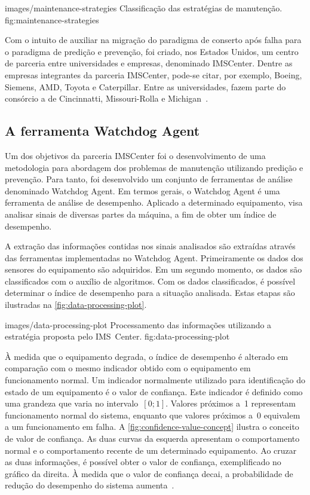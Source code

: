     {images/maintenance-strategies}
    {Classificação das estratégias de manutenção.}
    {fig:maintenance-strategies}

Com o intuito de auxiliar na migração do paradigma de conserto após falha para o paradigma de
predição e prevenção, foi criado, nos Estados Unidos, um centro de parceria entre universidades e
empresas, denominado \gls{IMSCenter}. Dentre as empresas integrantes da parceria \gls{IMSCenter},
pode-se citar, por exemplo, Boeing, Siemens, AMD, Toyota e Caterpillar. Entre as universidades,
fazem parte do consórcio a de Cincinnatti, Missouri-Rolla e Michigan~\cite{ims2014homepage}.


\subsection{A ferramenta Watchdog Agent}

Um dos objetivos da parceria \gls{IMSCenter} foi o desenvolvimento de uma metodologia para abordagem
dos problemas de manutenção utilizando predição e prevenção. Para tanto, foi desenvolvido um
conjunto de ferramentas de análise denominado Watchdog Agent. Em termos gerais, o Watchdog Agent é
uma ferramenta de análise de desempenho. Aplicado a determinado equipamento, visa analisar sinais de
diversas partes da máquina, a fim de obter um índice de desempenho.

A extração das informações contidas nos sinais analisados são extraídas através das ferramentas
implementadas no Watchdog Agent. Primeiramente os dados dos sensores do equipamento são adquiridos.
Em um segundo momento, os dados são classificados com o auxílio de algoritmos. Com os dados
classificados, é possível determinar o índice de desempenho para a situação analisada. Estas etapas
são ilustradas na \cref{fig:data-processing-plot}.

    {images/data-processing-plot}
    {Processamento das informações utilizando a estratégia proposta pelo IMS~Center.}
    {fig:data-processing-plot}

À medida que o equipamento degrada, o índice de desempenho é alterado em comparação com o mesmo
indicador obtido com o equipamento em funcionamento normal. Um indicador normalmente utilizado para
identificação do estado de um equipamento é o valor de confiança. Este indicador é definido como uma
grandeza que varia no intervalo~${[0; 1]}$. Valores próximos a~\num{1} representam funcionamento
normal do sistema, enquanto que valores próximos a~\num{0} equivalem a um funcionamento em falha. A
\cref{fig:confidence-value-concept} ilustra o conceito de valor de confiança. As duas curvas da
esquerda apresentam o comportamento normal e o comportamento recente de um determinado equipamento.
Ao cruzar as duas informações, é possível obter o valor de confiança, exemplificado no gráfico da
direita. À medida que o valor de confiança decai, a probabilidade de redução do desempenho do
sistema aumenta~\cite{djurdjanovic2003watchdog}.

